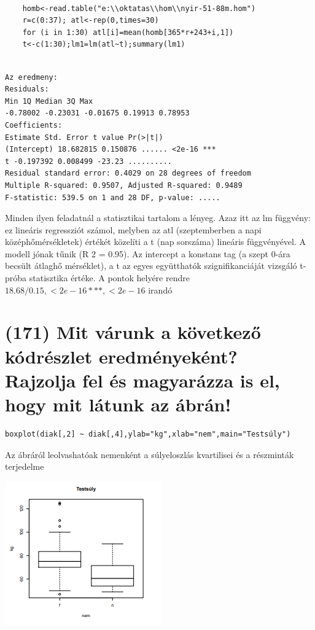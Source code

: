 \documentclass[12p]{article}
\begin{document}
\begin{verbatim}

	homb<-read.table("e:\\oktatas\\hom\\nyir-51-88m.hom")
	r=c(0:37); atl<-rep(0,times=30)
	for (i in 1:30) atl[i]=mean(homb[365*r+243+i,1])
	t<-c(1:30);lm1=lm(atl~t);summary(lm1)
	
\end{verbatim}
\begin{verbatim}
Az eredmeny:
Residuals:
Min 1Q Median 3Q Max
-0.78002 -0.23031 -0.01675 0.19913 0.78953
Coefficients:
Estimate Std. Error t value Pr(>|t|)
(Intercept) 18.682815 0.150876 ...... <2e-16 ***
t -0.197392 0.008499 -23.23 ..........
Residual standard error: 0.4029 on 28 degrees of freedom
Multiple R-squared: 0.9507, Adjusted R-squared: 0.9489
F-statistic: 539.5 on 1 and 28 DF, p-value: .....
\end{verbatim}

Minden ilyen feladatnál a statisztikai tartalom a lényeg. Azaz itt az lm függvény: ez
lineáris regressziót számol, melyben az atl (szeptemberben a napi középhőmérsékletek) értékét közelíti a t (nap sorszáma) lineáris függvényével. A modell jónak tűnik (R
2 = 0.95). Az
intercept a konstans tag (a szept 0-ára becsült átlaghő mérséklet), a t az egyes együtthatók
szignifikanciáját vizsgáló t-próba statisztika értéke. A pontok helyére rendre $18.68/0.15, < 2e - 16 ***,
< 2e - 16$ irandó


\section{(171) Mit várunk a következő kódrészlet eredményeként? Rajzolja fel és magyarázza is el, hogy
mit látunk az ábrán!}

\begin{verbatim}
boxplot(diak[,2] ~ diak[,4],ylab="kg",xlab="nem",main="Testsúly")
\end{verbatim}

Az ábráról leolvashatóak nemenként a súlyeloszlás kvartilisei és a részminták terjedelme

\includegraphics{boxplot}
\end{document}
